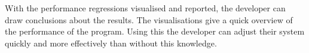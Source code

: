 With the performance regressions visualised and reported, the developer can draw conclusions about the results. The visualisations give a quick overview of the performance of the program. Using this the developer can adjust their system quickly and more effectively than without this knowledge.









